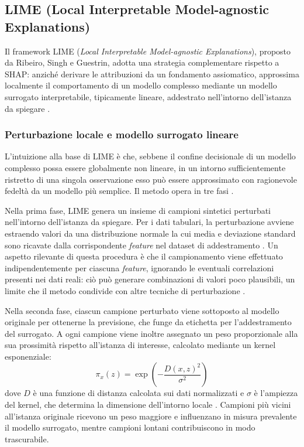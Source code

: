 \subsection{LIME (Local Interpretable Model-agnostic Explanations)}

Il framework LIME (\textit{Local Interpretable Model-agnostic Explanations}), proposto da Ribeiro, Singh e Guestrin, adotta una strategia complementare rispetto a SHAP: anziché derivare le attribuzioni da un fondamento assiomatico, approssima localmente il comportamento di un modello complesso mediante un modello surrogato interpretabile, tipicamente lineare, addestrato nell'intorno dell'istanza da spiegare \cite{ribeiro2016why}.

\subsubsection{Perturbazione locale e modello surrogato lineare}

L'intuizione alla base di LIME è che, sebbene il confine decisionale di un modello complesso possa essere globalmente non lineare, in un intorno sufficientemente ristretto di una singola osservazione esso può essere approssimato con ragionevole fedeltà da un modello più semplice. Il metodo opera in tre fasi \cite{ribeiro2016why}.

Nella prima fase, LIME genera un insieme di campioni sintetici perturbati nell'intorno dell'istanza da spiegare. Per i dati tabulari, la perturbazione avviene estraendo valori da una distribuzione normale la cui media e deviazione standard sono ricavate dalla corrispondente \textit{feature} nel dataset di addestramento \cite{molnar2025interpretable}. Un aspetto rilevante di questa procedura è che il campionamento viene effettuato indipendentemente per ciascuna \textit{feature}, ignorando le eventuali correlazioni presenti nei dati reali: ciò può generare combinazioni di valori poco plausibili, un limite che il metodo condivide con altre tecniche di perturbazione \cite{molnar2025interpretable}.

Nella seconda fase, ciascun campione perturbato viene sottoposto al modello originale per ottenerne la previsione, che funge da etichetta per l'addestramento del surrogato. A ogni campione viene inoltre assegnato un peso proporzionale alla sua prossimità rispetto all'istanza di interesse, calcolato mediante un kernel esponenziale:
\[
\pi_x(z) = \exp\!\left(-\frac{D(x, z)^2}{\sigma^2}\right)
\]
dove $D$ è una funzione di distanza calcolata sui dati normalizzati e $\sigma$ è l'ampiezza del kernel, che determina la dimensione dell'intorno locale \cite{ribeiro2016why}. Campioni più vicini all'istanza originale ricevono un peso maggiore e influenzano in misura prevalente il modello surrogato, mentre campioni lontani contribuiscono in modo trascurabile.

